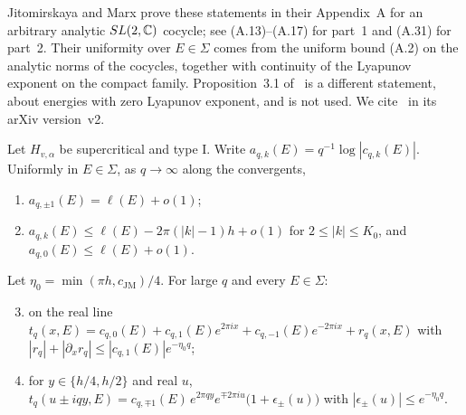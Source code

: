 Jitomirskaya and Marx prove these statements in their Appendix~A for an arbitrary analytic $SL(2,\mathbb C)$ cocycle; see (A.13)--(A.17) for part~1 and (A.31) for part~2. Their uniformity over $E\in\Sigma$ comes from the uniform bound (A.2) on the analytic norms of the cocycles, together with continuity of the Lyapunov exponent on the compact family. Proposition~3.1 of~\cite{JitomirskayaMarx2012} is a different statement, about energies with zero Lyapunov exponent, and is not used. We cite~\cite{JitomirskayaMarx2012} in its arXiv version~v2.

\begin{proposition}\label{prop:tI-C3}
Let $H_{v,\alpha}$ be supercritical and type I. Write $a_{q,k}(E)=q^{-1}\log|c_{q,k}(E)|$. Uniformly in $E\in\Sigma$, as $q\to\infty$ along the convergents,
\begin{enumerate}
\item $a_{q,\pm1}(E)=\ell(E)+o(1)$;
\item $a_{q,k}(E)\le\ell(E)-2\pi(|k|-1)h+o(1)$ for $2\le|k|\le K_0$, and $a_{q,0}(E)\le\ell(E)+o(1)$.
\end{enumerate}
Let $\eta_0=\min(\pi h,c_{\mathrm{JM}})/4$. For large $q$ and every $E\in\Sigma$:
\begin{enumerate}
\setcounter{enumi}{2}
\item on the real line $t_q(x,E)=c_{q,0}(E)+c_{q,1}(E)e^{2\pi ix}+c_{q,-1}(E)e^{-2\pi ix}+r_q(x,E)$ with $|r_q|+|\partial_xr_q|\le|c_{q,1}(E)|e^{-\eta_0q}$;
\item for $y\in\{h/4,h/2\}$ and real $u$, $t_q(u\pm iqy,E)=c_{q,\mp1}(E)\,e^{2\pi qy}e^{\mp2\pi iu}\bigl(1+\epsilon_\pm(u)\bigr)$ with $|\epsilon_\pm(u)|\le e^{-\eta_0q}$.
\end{enumerate}
\end{proposition}

